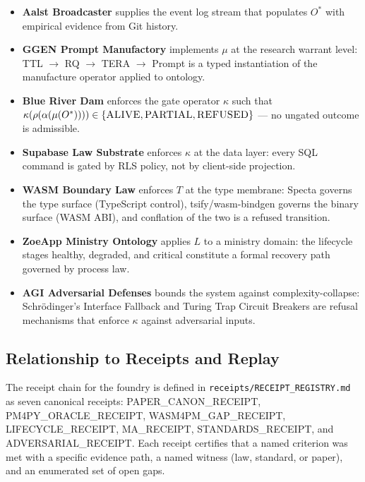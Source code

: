 \begin{itemize}
  \item \textbf{Aalst Broadcaster} supplies the event log stream that populates
        $O^*$ with empirical evidence from Git history.
  \item \textbf{GGEN Prompt Manufactory} implements $\mu$ at the research
        warrant level: TTL $\to$ RQ $\to$ TERA $\to$ Prompt is a typed
        instantiation of the manufacture operator applied to ontology.
  \item \textbf{Blue River Dam} enforces the gate operator $\kappa$ such that
        $\kappa(\rho(\alpha(\mu(O^*)))) \in \{\textsc{ALIVE}, \textsc{PARTIAL},
        \textsc{REFUSED}\}$ --- no ungated outcome is admissible.
  \item \textbf{Supabase Law Substrate} enforces $\kappa$ at the data layer:
        every SQL command is gated by RLS policy, not by client-side projection.
  \item \textbf{WASM Boundary Law} enforces $T$ at the type membrane: Specta
        governs the type surface (TypeScript control), tsify/wasm-bindgen governs
        the binary surface (WASM ABI), and conflation of the two is a refused
        transition.
  \item \textbf{ZoeApp Ministry Ontology} applies $L$ to a ministry domain:
        the lifecycle stages healthy, degraded, and critical constitute a formal
        recovery path governed by process law.
  \item \textbf{AGI Adversarial Defenses} bounds the system against
        complexity-collapse: Schr\"odinger's Interface Fallback and Turing Trap
        Circuit Breakers are refusal mechanisms that enforce $\kappa$ against
        adversarial inputs.
\end{itemize}

\subsection{Relationship to Receipts and Replay}
\label{sec:atlas-lineage-receipts}

The receipt chain for the foundry is defined in
\texttt{receipts/RECEIPT\_REGISTRY.md} as seven canonical receipts:
PAPER\_CANON\_RECEIPT, PM4PY\_ORACLE\_RECEIPT, WASM4PM\_GAP\_RECEIPT,
LIFECYCLE\_RECEIPT, MA\_RECEIPT, STANDARDS\_RECEIPT, and
ADVERSARIAL\_RECEIPT. Each receipt certifies that a named criterion was met with
a specific evidence path, a named witness (law, standard, or paper), and an
enumerated set of open gaps.

